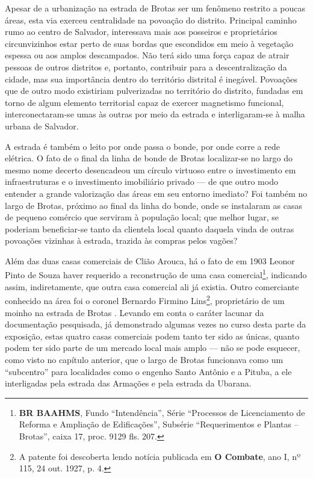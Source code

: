 
Apesar de a urbanização na estrada de Brotas ser um fenômeno restrito a poucas áreas, esta via exerceu centralidade na povoação do distrito. Principal caminho rumo ao centro de Salvador, interessava mais aos posseiros e proprietários circunvizinhos estar perto de suas bordas que escondidos em meio à vegetação espessa ou aos amplos descampados. Não terá sido uma força capaz de atrair pessoas de outros distritos e, portanto, contribuir para a descentralização da cidade, mas sua importância dentro do território distrital é inegável. Povoações que de outro modo existiriam pulverizadas no território do distrito, fundadas em torno de algum elemento territorial capaz de exercer magnetismo funcional, interconectaram-se umas às outras por meio da estrada e interligaram-se à malha urbana de Salvador.

A estrada é também o leito por onde passa o bonde, por onde corre a rede elétrica. O fato de o final da linha de bonde de Brotas localizar-se no largo do mesmo nome decerto desencadeou um círculo virtuoso entre o investimento em infraestruturas e o investimento imobiliário privado --- de que outro modo entender a grande valorização das áreas em seu entorno imediato? Foi também no largo de Brotas, próximo ao final da linha do bonde, onde se instalaram as casas de pequeno comércio que serviram à população local; que melhor lugar, se poderiam beneficiar-se tanto da clientela local quanto daquela vinda de outras povoações vizinhas à estrada, trazida às compras pelos vagões?


Além das duas casas comerciais de Clião Arouca, há o fato de em 1903 Leonor Pinto de Souza haver requerido a reconstrução de uma casa comercial\footnote{\textbf{BR BAAHMS}, Fundo ``Intendência'', Série ``Processos de Licenciamento de Reforma e Ampliação de Edificações'', Subsérie ``Requerimentos e Plantas -- Brotas'', caixa 17, proc. 9129 fls. 207.}, indicando assim, indiretamente, que outra casa comercial ali já existia. Outro comerciante conhecido na área foi o coronel Bernardo Firmino Lins\footnote{A patente foi descoberta lendo notícia publicada em \textbf{O Combate}, ano I, nº 115, 24 out. 1927, p. 4.}, proprietário de um moinho na estrada de Brotas \cite[p.~433]{reis_almanak_1898}. Levando em conta o caráter lacunar da documentação pesquisada, já demonstrado algumas vezes no curso desta parte da exposição, estas quatro casas comerciais podem tanto ter sido as únicas, quanto podem ter sido parte de um mercado local mais amplo --- não se pode esquecer, como visto no capítulo anterior, que o largo de Brotas funcionava como um ``subcentro'' para localidades como o engenho Santo Antônio e a Pituba, a ele interligadas pela estrada das Armações e pela estrada da Ubarana.

